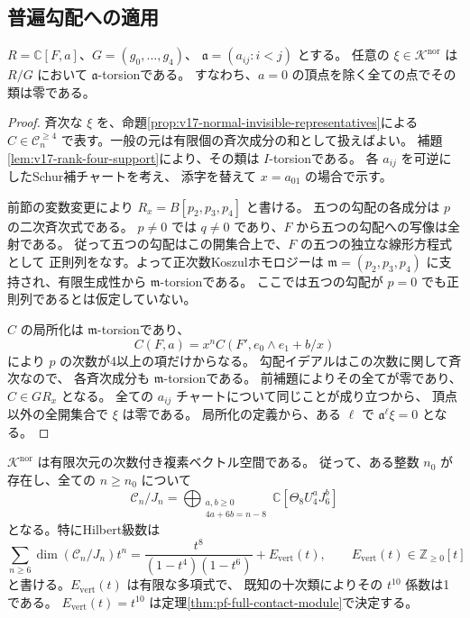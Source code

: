 \subsection{普遍勾配への適用}

\begin{theorem}[横断射影の核は頂点に支持される]
\label{thm:v17-normal-kernel-vertex-support}
$R=\mathbb C[F,a]$、$G=(g_0,\ldots,g_4)$、
$\mathfrak a=(a_{ij}:i<j)$ とする。
任意の $\xi\in\mathcal K^{\mathrm{nor}}$ は $R/G$ において
$\mathfrak a$-torsionである。
すなわち、$a=0$ の頂点を除く全ての点でその類は零である。
\end{theorem}

\begin{proof}
斉次な $\xi$ を、命題\ref{prop:v17-normal-invisible-representatives}による
$C\in\mathcal C_n^{\ge4}$ で表す。一般の元は有限個の斉次成分の和として扱えばよい。
補題\ref{lem:v17-rank-four-support}により、その類は $I$-torsionである。
各 $a_{ij}$ を可逆にしたSchur補チャートを考え、
添字を替えて $x=a_{01}$ の場合で示す。

前節の変数変更により $R_x=B[p_2,p_3,p_4]$ と書ける。
五つの勾配の各成分は $p$ の二次斉次式である。
$p\ne0$ では $q\ne0$ であり、$F$ から五つの勾配への写像は全射である。
従って五つの勾配はこの開集合上で、$F$ の五つの独立な線形方程式として
正則列をなす。よって正次数Koszulホモロジーは
$\mathfrak m=(p_2,p_3,p_4)$ に支持され、有限生成性から
$\mathfrak m$-torsionである。
ここでは五つの勾配が $p=0$ でも正則列であるとは仮定していない。

$C$ の局所化は $\mathfrak m$-torsionであり、
\[
 C(F,a)=x^nC(F',e_0\wedge e_1+b/x)
\]
により $p$ の次数が4以上の項だけからなる。
勾配イデアルはこの次数に関して斉次なので、
各斉次成分も $\mathfrak m$-torsionである。
前補題によりその全てが零であり、$C\in GR_x$ となる。
全ての $a_{ij}$ チャートについて同じことが成り立つから、
頂点以外の全開集合で $\xi$ は零である。
局所化の定義から、ある $\ell$ で $\mathfrak a^\ell\xi=0$ となる。
\end{proof}

\begin{theorem}[未知部分の有限次元性と十分高い次数の通常商]
\label{thm:v17-finite-normal-kernel}
$\mathcal K^{\mathrm{nor}}$ は有限次元の次数付き複素ベクトル空間である。
従って、ある整数 $n_0$ が存在し、全ての $n\ge n_0$ について
\begin{equation}\label{eq:v17-eventual-contact-quotient}
 \mathcal C_n/J_n
  =\bigoplus_{\substack{a,b\ge0\\4a+6b=n-8}}
      \mathbb C[\Theta_8U_4^aJ_6^b]
\end{equation}
となる。特にHilbert級数は
\begin{equation}\label{eq:v17-contact-hilbert-finite-correction}
 \sum_{n\ge6}\dim(\mathcal C_n/J_n)t^n
   =\frac{t^8}{(1-t^4)(1-t^6)}+E_{\mathrm{vert}}(t),
 \qquad E_{\mathrm{vert}}(t)\in\mathbb Z_{\ge0}[t]
\end{equation}
と書ける。$E_{\mathrm{vert}}(t)$ は有限な多項式で、
既知の十次類によりその $t^{10}$ 係数は1である。
$E_{\mathrm{vert}}(t)=t^{10}$ は定理\ref{thm:pf-full-contact-module}で決定する。
\end{theorem}

